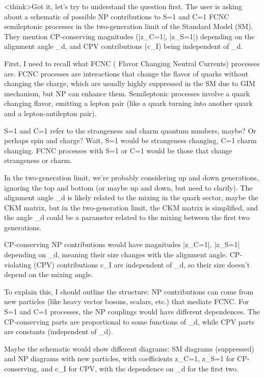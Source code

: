 <think>Got it, let's try to understand the question first. The user is asking about a schematic of possible NP contributions to S=1 and C=1 FCNC semileptonic processes in the two-generation limit of the Standard Model (SM). They mention CP-conserving magnitudes (|z_C=1|, |z_S=1|) depending on the alignment angle _d, and CPV contributions (c_I) being independent of _d. 

First, I need to recall what FCNC ( Flavor Changing Neutral Currents) processes are. FCNC processes are interactions that change the flavor of quarks without changing the charge, which are usually highly suppressed in the SM due to GIM mechanism, but NP can enhance them. Semileptonic processes involve a quark changing flavor, emitting a lepton pair (like a quark turning into another quark and a lepton-antilepton pair). 

S=1 and C=1 refer to the strangeness and charm quantum numbers, maybe? Or perhaps spin and charge? Wait, S=1 would be strangeness changing, C=1 charm changing. FCNC processes with S=1 or C=1 would be those that change strangeness or charm. 

In the two-generation limit, we're probably considering up and down generations, ignoring the top and bottom (or maybe up and down, but need to clarify). The alignment angle _d is likely related to the mixing in the quark sector, maybe the CKM matrix, but in the two-generation limit, the CKM matrix is simplified, and the angle _d could be a parameter related to the mixing between the first two generations. 

CP-conserving NP contributions would have magnitudes |z_C=1|, |z_S=1| depending on _d, meaning their size changes with the alignment angle. CP-violating (CPV) contributions c_I are independent of _d, so their size doesn't depend on the mixing angle. 

To explain this, I should outline the structure: NP contributions can come from new particles (like heavy vector bosons, scalars, etc.) that mediate FCNC. For S=1 and C=1 processes, the NP couplings would have different dependences. The CP-conserving parts are proportional to some functions of _d, while CPV parts are constants (independent of _d). 

Maybe the schematic would show different diagrams: SM diagrams (suppressed) and NP diagrams with new particles, with coefficients z_C=1, z_S=1 for CP-conserving, and c_I for CPV, with the dependence on _d for the first two. 


